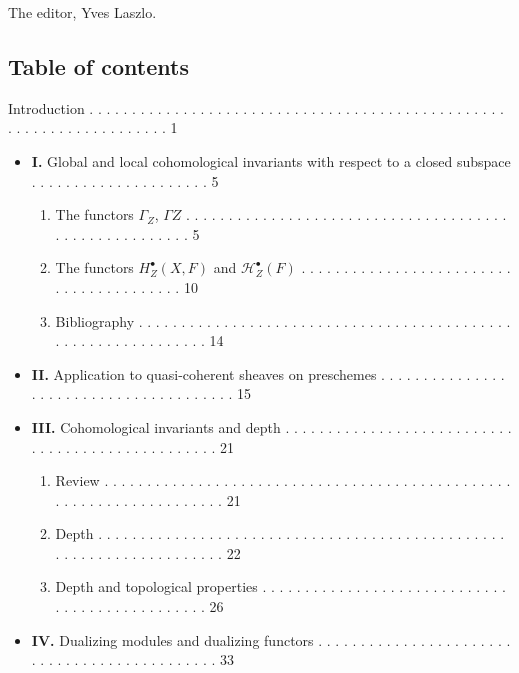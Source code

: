\documentclass[
]{article}
\providecommand{\tightlist}{%
  \setlength{\itemsep}{0pt}\setlength{\parskip}{0pt}}
\begin{document}
The editor, Yves Laszlo.

\subsection{Table of contents}\label{table-of-contents}

Introduction . . . . . . . . . . . . . . . . . . . . . . . . . . . . . .
. . . . . . . . . . . . . . . . . . . . . . . . . . . . . . . . . . . .
. . 1

\begin{itemize}
\item
  \textbf{I.} Global and local cohomological invariants with respect to
  a closed subspace . . . . . . . . . . . . . . . . . . . . . 5

  \begin{enumerate}
  \def\labelenumi{\arabic{enumi}.}
  \tightlist
  \item
    The functors \(\Gamma_{Z}\), \(\Gamma Z\) . . . . . . . . . . . . .
    . . . . . . . . . . . . . . . . . . . . . . . . . . . . . . . . . .
    . . . . . . . 5
  \item
    The functors \(H^{\bullet}_{Z}(X, F)\) and
    \(\mathcal{H}^{\bullet}_{Z}(F)\) . . . . . . . . . . . . . . . . . .
    . . . . . . . . . . . . . . . . . . . . . . 10
  \item
    Bibliography . . . . . . . . . . . . . . . . . . . . . . . . . . . .
    . . . . . . . . . . . . . . . . . . . . . . . . . . . . . . . . . .
    14
  \end{enumerate}
\item
  \textbf{II.} Application to quasi-coherent sheaves on preschemes . . .
  . . . . . . . . . . . . . . . . . . . . . . . . . . . . . . . . . . .
  . 15
\item
  \textbf{III.} Cohomological invariants and depth . . . . . . . . . . .
  . . . . . . . . . . . . . . . . . . . . . . . . . . . . . . . . . . .
  . . . 21

  \begin{enumerate}
  \def\labelenumi{\arabic{enumi}.}
  \tightlist
  \item
    Review . . . . . . . . . . . . . . . . . . . . . . . . . . . . . . .
    . . . . . . . . . . . . . . . . . . . . . . . . . . . . . . . . . .
    . . . 21
  \item
    Depth . . . . . . . . . . . . . . . . . . . . . . . . . . . . . . .
    . . . . . . . . . . . . . . . . . . . . . . . . . . . . . . . . . .
    . . . 22
  \item
    Depth and topological properties . . . . . . . . . . . . . . . . . .
    . . . . . . . . . . . . . . . . . . . . . . . . . . . . . 26
  \end{enumerate}
\item
  \textbf{IV.} Dualizing modules and dualizing functors . . . . . . . .
  . . . . . . . . . . . . . . . . . . . . . . . . . . . . . . . . . . .
  . . 33


\end{itemize}
\end{document}
